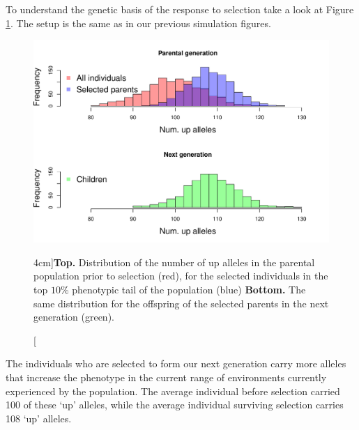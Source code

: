 To understand the genetic basis of the response to selection take a
look at Figure \ref{Fig:Response_num_alleles}. The setup is the same as in our previous
simulation figures.
\begin{figure}
\begin{center}
\includegraphics[width=\textwidth]{figures/QT3_w_genosums.pdf}
\end{center}
\caption[][4cm]{{\bf Top.} Distribution of the number of up alleles in the parental population
  prior to selection (red), for the selected individuals in the top
  $10\%$ phenotypic tail of the population (blue) {\bf Bottom.}  The same distribution
for the offspring of the selected parents in the next generation
(green). }  \label{Fig:Response_num_alleles}
\end{figure}
 The individuals who are selected to form our next generation carry
 more alleles that increase the phenotype in the current range of
 environments currently experienced by the population. The average
 individual before selection carried 100 of these `up' alleles, while the average
 individual surviving selection carries 108 `up' alleles.
